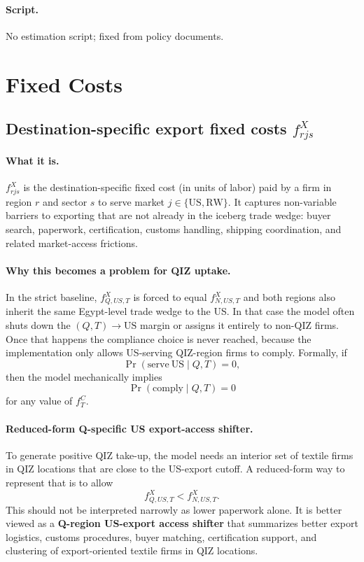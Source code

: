 \documentclass[12pt]{article}
\begin{document}
\paragraph{Script.} No estimation script; fixed from policy documents.

\section{Fixed Costs}

\subsection{Destination-specific export fixed costs $f^X_{rjs}$}

\paragraph{What it is.}
$f^X_{rjs}$ is the destination-specific fixed cost (in units of labor) paid by
a firm in region $r$ and sector $s$ to serve market
$j \in \{\mathrm{US}, \mathrm{RW}\}$. It captures non-variable barriers to
exporting that are not already in the iceberg trade wedge: buyer search,
paperwork, certification, customs handling, shipping coordination, and related
market-access frictions.

\paragraph{Why this becomes a problem for QIZ uptake.}
In the strict baseline, $f^X_{Q,US,T}$ is forced to equal $f^X_{N,US,T}$ and
both regions also inherit the same Egypt-level trade wedge to the US. In that
case the model often shuts down the $(Q,T)\rightarrow \mathrm{US}$ margin or
assigns it entirely to non-QIZ firms. Once that happens the compliance choice
is never reached, because the implementation only allows US-serving QIZ-region
firms to comply. Formally, if
\[
\Pr(\mathrm{serve\ US}\mid Q,T)=0,
\]
then the model mechanically implies
\[
\Pr(\mathrm{comply}\mid Q,T)=0
\]
for any value of $f^C_T$.

\paragraph{Reduced-form Q-specific US export-access shifter.}
To generate positive QIZ take-up, the model needs an interior set of textile
firms in QIZ locations that are close to the US-export cutoff. A reduced-form
way to represent that is to allow
\[
f^X_{Q,US,T} < f^X_{N,US,T}.
\]
This should not be interpreted narrowly as lower paperwork alone. It is better
viewed as a \textbf{Q-region US-export access shifter} that summarizes better
export logistics, customs procedures, buyer matching, certification support,
and clustering of export-oriented textile firms in QIZ locations.
\end{document}
